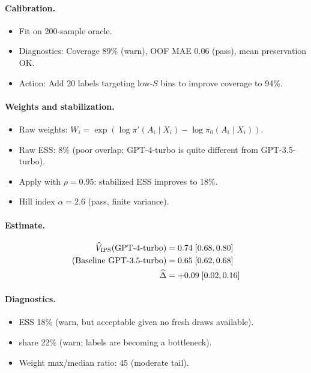 \paragraph{Calibration.}
\begin{itemize}
\item Fit \autocal{} on 200-sample oracle.
\item Diagnostics: Coverage 89\% (warn), OOF MAE 0.06 (pass), mean preservation OK.
\item Action: Add 20 labels targeting low-$S$ bins to improve coverage to 94\%.
\end{itemize}

\paragraph{Weights and stabilization.}
\begin{itemize}
\item Raw weights: $W_i = \exp(\log \pi'(A_i \mid X_i) - \log \pi_0(A_i \mid X_i))$.
\item Raw ESS: 8\% (poor overlap; GPT-4-turbo is quite different from GPT-3.5-turbo).
\item Apply \simcal{} with $\rho = 0.95$: stabilized ESS improves to 18\%.
\item Hill index $\alpha = 2.6$ (pass, finite variance).
\end{itemize}

\paragraph{Estimate.}
\begin{align*}
\widehat{V}_{\text{IPS}}(\text{GPT-4-turbo}) &= 0.74 \; [0.68, 0.80] \\
\text{(Baseline GPT-3.5-turbo)} &= 0.65 \; [0.62, 0.68] \\
\widehat{\Delta} &= +0.09 \; [0.02, 0.16]
\end{align*}

\paragraph{Diagnostics.}
\begin{itemize}
\item ESS 18\% (warn, but acceptable given no fresh draws available).
\item \oua{} share 22\% (warn; labels are becoming a bottleneck).
\item Weight max/median ratio: 45 (moderate tail).
\end{itemize}

